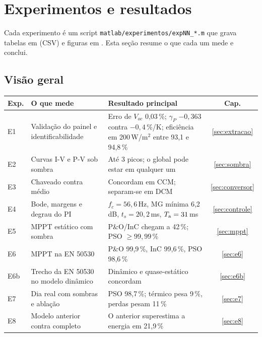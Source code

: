 \section{Experimentos e resultados}\label{sec:resultados}

Cada experimento \'e um script \texttt{matlab/experimentos/expNN\_*.m} que grava tabelas em  (CSV) e figuras em . Esta se\c{c}\~ao resume o que cada um
mede e conclui.

\subsection{Vis\~ao geral}

\begin{center}\small
\begin{tabularx}{\textwidth}{@{}l>{\raggedright\arraybackslash}X>{\raggedright\arraybackslash}Xc@{}}
\toprule
Exp. & O que mede & Resultado principal & Cap. \\ \midrule
E1 & Valida\c{c}\~ao do painel e identificabilidade & Erro de $V_{oc}$ 0,03\,\%; $\gamma_P$ $-0{,}363$ contra $-0{,}4$\,\%/K; efici\^encia em 200\,W/m$^2$ entre 93,1 e 94,8\,\% & \ref{sec:extracao} \\
E2 & Curvas I-V e P-V sob sombra & At\'e 3 picos; o global pode estar em qualquer um & \ref{sec:sombra} \\
E3 & Chaveado contra m\'edio & Concordam em CCM; separam-se em DCM & \ref{sec:conversor} \\
E4 & Bode, margens e degrau do PI & $f_c=56{,}6$\,Hz, MG m\'inima 6,2\,dB, $t_s=20{,}2$\,ms, $T_{\mathrm{a}}=31$\,ms & \ref{sec:controle} \\
E5 & MPPT est\'atico com sombra & P\&O/InC chegam a 42\,\%; PSO $\ge99{,}99$\,\% & \ref{sec:mppt} \\
E6 & MPPT na EN 50530 & P\&O 99,9\,\%, InC 99,6\,\%, PSO 98,6\,\% & \ref{sec:e6} \\
E6b & Trecho da EN 50530 no modelo din\^amico & Din\^amico e quase-est\'atico concordam & \ref{sec:e6b} \\
E7 & Dia real com sombras e abla\c{c}\~ao & PSO 98,7\,\%; t\'ermico pesa 9\,\%, perdas pesam 11\,\% & \ref{sec:e7} \\
E8 & Modelo anterior contra completo & O anterior superestima a energia em 21,9\,\% & \ref{sec:e8} \\
\bottomrule
\end{tabularx}
\end{center}


